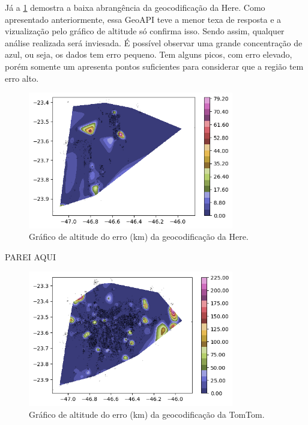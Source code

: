 Já a \ref{fig:grafAltH} demostra a baixa abrangência da geocodificação da Here. Como apresentado anteriormente, essa GeoAPI teve a menor texa de resposta e a vizualização pelo gráfico de altitude só confirma isso. Sendo assim, qualquer análise realizada será inviesada. É possível observar uma grande concentração de azul, ou seja, os dados tem erro pequeno. Tem alguns picos, com erro elevado, porém somente um apresenta pontos suficientes para considerar que a região tem erro alto. 

\begin{figure}[h]
  \centering
  \includegraphics[width=0.8\textwidth]{Figuras/graficoAltPontosHere.png}
  \caption{Gráfico de altitude do erro (km) da geocodificação da Here.}
  \label{fig:grafAltH}
\end{figure}

PAREI AQUI
\begin{figure}[h]
  \centering
  \includegraphics[width=0.8\textwidth]{Figuras/graficoAltPontosTomtom.png}
  \caption{Gráfico de altitude do erro (km) da geocodificação da TomTom.}
  \label{fig:grafAltT}
\end{figure}